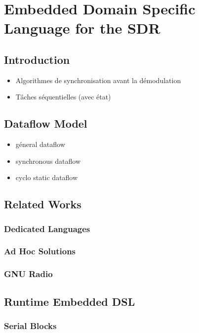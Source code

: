 \chapter{Embedded Domain Specific Language for the SDR}

\section{Introduction}

\begin{itemize}
  \item Algorithmes de synchronisation avant la démodulation
  \item Tâches séquentielles (avec état)
\end{itemize}

\section{Dataflow Model}

\begin{itemize}
  \item géneral dataflow
  \item synchronous dataflow
  \item cyclo static dataflow
\end{itemize}

\section{Related Works}

\subsection{Dedicated Languages}

\subsection{Ad Hoc Solutions}

\subsection{GNU Radio}

\section{Runtime Embedded DSL}

\subsection{Serial Blocks}

